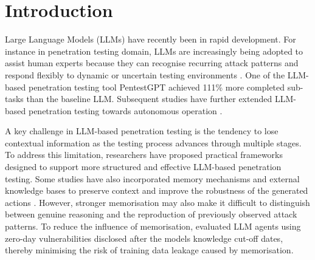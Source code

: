 \documentclass[acmtog]{acmart}
\begin{document}


\maketitle

\section{Introduction}

Large Language Models (LLMs) have recently been in rapid development. For instance in penetration testing domain, LLMs are increasingly being adopted to assist human experts because they can recognise recurring attack patterns and respond flexibly to dynamic or uncertain testing environments \cite{happe_surprising_2025}. One of the LLM-based penetration testing tool PentestGPT \cite{deng_pentestgpt_2024} achieved 111\% more completed sub-tasks than the baseline LLM. Subsequent studies have further extended LLM-based penetration testing towards autonomous operation \cite{kong_vulnbot_2025,gioacchini_autopenbench_2024,huang_penheal_2023,dai_refpentester_2025,xu_autoattacker_2024}. 

A key challenge in LLM-based penetration testing is the tendency to lose contextual information as the testing process advances through multiple stages. To address this limitation, researchers have proposed practical frameworks designed to support more structured and effective LLM-based penetration testing. Some studies have also incorporated memory mechanisms and external knowledge bases to preserve context and improve the robustness of the generated actions \cite{challita_redteamllm_2025}. However, stronger memorisation may also make it difficult to distinguish between genuine reasoning and the reproduction of previously observed attack patterns. To reduce the influence of memorisation, \citet{zhu_teams_2025} evaluated LLM agents using zero-day vulnerabilities disclosed after the models knowledge cut-off dates, thereby minimising the risk of training data leakage caused by memorisation.
\end{document}
